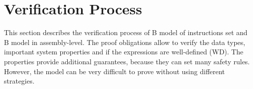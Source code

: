 \documentclass[11pt]{article} %
\begin{document}
% 

\section{Verification Process}
\label{sec:Verification}

This section describes the verification process of B model of instructions set
and B model in assembly-level. The proof obligations allow to verify the data
types, important system properties and if the expressions are well-defined (WD). The
properties provide additional guarantees, because they can set many
safety rules. However, the model can be very difficult to prove without using
different strategies.
\end{document}
